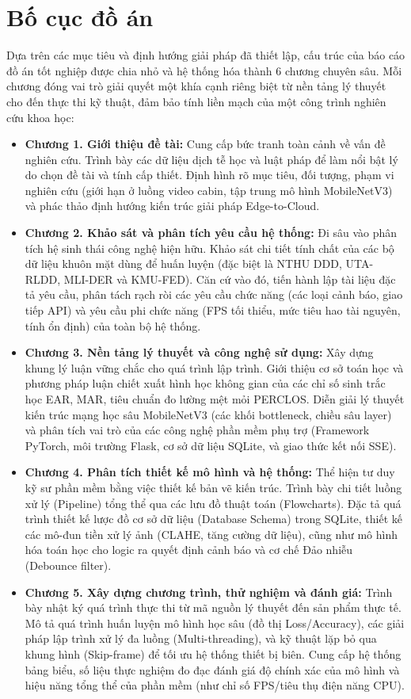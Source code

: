 \documentclass[../DoAn.tex]{subfiles}
\begin{document}
\section{Bố cục đồ án}
\label{section:1.5}
Dựa trên các mục tiêu và định hướng giải pháp đã thiết lập, cấu trúc của báo cáo đồ án tốt nghiệp được chia nhỏ và hệ thống hóa thành 6 chương chuyên sâu. Mỗi chương đóng vai trò giải quyết một khía cạnh riêng biệt từ nền tảng lý thuyết cho đến thực thi kỹ thuật, đảm bảo tính liền mạch của một công trình nghiên cứu khoa học:
\begin{itemize}
    \item \textbf{Chương 1. Giới thiệu đề tài:} Cung cấp bức tranh toàn cảnh về vấn đề nghiên cứu. Trình bày các dữ liệu dịch tễ học và luật pháp để làm nổi bật lý do chọn đề tài và tính cấp thiết. Định hình rõ mục tiêu, đối tượng, phạm vi nghiên cứu (giới hạn ở luồng video cabin, tập trung mô hình MobileNetV3) và phác thảo định hướng kiến trúc giải pháp Edge-to-Cloud.
    \item \textbf{Chương 2. Khảo sát và phân tích yêu cầu hệ thống:} Đi sâu vào phân tích hệ sinh thái công nghệ hiện hữu. Khảo sát chi tiết tính chất của các bộ dữ liệu khuôn mặt dùng để huấn luyện (đặc biệt là NTHU DDD, UTA-RLDD, MLI-DER và KMU-FED). Căn cứ vào đó, tiến hành lập tài liệu đặc tả yêu cầu, phân tách rạch ròi các yêu cầu chức năng (các loại cảnh báo, giao tiếp API) và yêu cầu phi chức năng (FPS tối thiểu, mức tiêu hao tài nguyên, tính ổn định) của toàn bộ hệ thống.
    \item \textbf{Chương 3. Nền tảng lý thuyết và công nghệ sử dụng:} Xây dựng khung lý luận vững chắc cho quá trình lập trình. Giới thiệu cơ sở toán học và phương pháp luận chiết xuất hình học không gian của các chỉ số sinh trắc học EAR, MAR, tiêu chuẩn đo lường mệt mỏi PERCLOS. Diễn giải lý thuyết kiến trúc mạng học sâu MobileNetV3 (các khối bottleneck, chiều sâu layer) và phân tích vai trò của các công nghệ phần mềm phụ trợ (Framework PyTorch, môi trường Flask, cơ sở dữ liệu SQLite, và giao thức kết nối SSE).
    \item \textbf{Chương 4. Phân tích thiết kế mô hình và hệ thống:} Thể hiện tư duy kỹ sư phần mềm bằng việc thiết kế bản vẽ kiến trúc. Trình bày chi tiết luồng xử lý (Pipeline) tổng thể qua các lưu đồ thuật toán (Flowcharts). Đặc tả quá trình thiết kế lược đồ cơ sở dữ liệu (Database Schema) trong SQLite, thiết kế các mô-đun tiền xử lý ảnh (CLAHE, tăng cường dữ liệu), cũng như mô hình hóa toán học cho logic ra quyết định cảnh báo và cơ chế Đảo nhiễu (Debounce filter).
    \item \textbf{Chương 5. Xây dựng chương trình, thử nghiệm và đánh giá:} Trình bày nhật ký quá trình thực thi từ mã nguồn lý thuyết đến sản phẩm thực tế. Mô tả quá trình huấn luyện mô hình học sâu (đồ thị Loss/Accuracy), các giải pháp lập trình xử lý đa luồng (Multi-threading), và kỹ thuật lặp bỏ qua khung hình (Skip-frame) để tối ưu hệ thống thiết bị biên. Cung cấp hệ thống bảng biểu, số liệu thực nghiệm đo đạc đánh giá độ chính xác của mô hình và hiệu năng tổng thể của phần mềm (như chỉ số FPS/tiêu thụ điện năng CPU).

\end{itemize}
\end{document}
